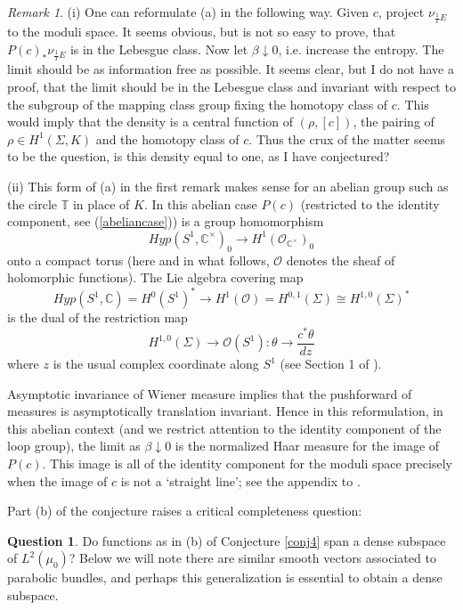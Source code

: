 \documentclass{amsart}
\theoremstyle{conjecture}
\theoremstyle{definition}
\theoremstyle{question}
\newtheorem{question}{Question}
\theoremstyle{questions}
\theoremstyle{remark}
\newtheorem*{remark}{Remark}
\theoremstyle{remarks}
\theoremstyle{example}
\numberwithin{equation}{section}
\begin{document}
\begin{remark}\label{conj4remarks} (i) One can reformulate (a) in the following way. Given $c$, project $\nu_{\frac 1T E}$ to the moduli space. It seems obvious, but is not so easy to prove, that $P(c)_*\nu_{\frac 1T E}$ is in the Lebesgue class. Now let $\beta \downarrow 0$, i.e. increase the entropy. The limit should be as information free as possible.
It seems clear, but I do not have a proof, that the limit should be in the Lebesgue class and invariant with respect to the subgroup of the mapping class group fixing the homotopy class of $c$. This would imply
that the density is a central function of $(\rho,[c])$, the pairing of $\rho \in H^1(\Sigma,K)$ and the homotopy class of $c$. Thus the crux of the matter seems to be the question, is this density equal to one, as I have conjectured?


(ii) This form of (a) in the first remark makes sense for an abelian group such as the circle $\mathbb T$ in place of $K$. In this abelian case $P(c)$ (restricted to the identity component, see (\ref{abeliancase})) is a group homomorphism
$$Hyp(S^1,\mathbb C^{\times})_0\to H^1(\mathcal O_{\mathbb C^{\times}})_0$$
onto a compact torus (here and in what follows, $\mathcal O$ denotes the sheaf of holomorphic functions). The Lie algebra covering map
$$Hyp(S^1,\mathbb C)=H^0(S^1)^{*}\to H^1(\mathcal O)=H^{0,1}(\Sigma )\cong H^{1,0}(\Sigma
)^{*} $$
is the dual of the restriction map
$$H^{1,0}(\Sigma )\to \mathcal O(S^1):\theta\to\frac {c^{*}\theta}{dz}$$
where $z$ is the usual complex coordinate along $S^1$ (see Section 1 of \cite{BP0}).

Asymptotic invariance of Wiener measure implies that the pushforward of measures is asymptotically translation invariant. Hence in this reformulation, in this abelian context (and we restrict attention to the identity component of the loop group), the limit as $\beta\downarrow 0$ is the normalized Haar measure for the image of $P(c)$. This image is all of the identity component for the moduli space precisely when the image of $c$ is not a `straight line'; see the appendix to \cite{BP0}.
\end{remark}


Part (b) of the conjecture raises a critical completeness question:

\begin{question}Do functions as in (b) of Conjecture \ref{conj4} span a dense subspace of $L^2(\mu_0)$?
Below we will note there are similar smooth vectors associated to parabolic bundles, and perhaps this generalization is essential to obtain a dense subspace.
\end{question}
\end{document}
